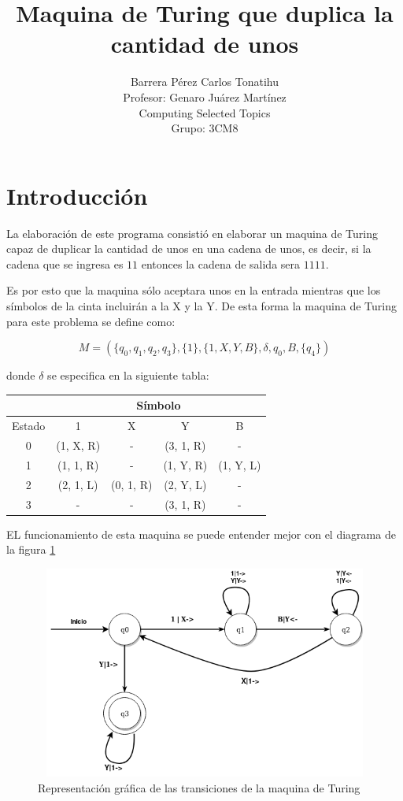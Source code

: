 \documentclass[a4paper,12pt]{article}
\title{Maquina de Turing que duplica la cantidad de unos}
\author{Barrera Pérez Carlos Tonatihu \\ Profesor: Genaro Juárez Martínez \\ Computing Selected Topics \\ Grupo: 3CM8 }
\begin{document}
\maketitle
\newpage
\tableofcontents
\newpage
\section{Introducción}
La elaboración de este programa consistió en elaborar un maquina de Turing capaz de duplicar la cantidad de unos en una cadena de unos, es decir, si la cadena que se ingresa es $ 11 $ entonces la cadena de salida sera $ 1111 $.

Es por esto que la maquina sólo aceptara unos en la entrada mientras que los símbolos de la cinta incluirán a la X y la Y. De esta forma la maquina de Turing para este problema se define como:

\[M=(\lbrace q_{0}, q_{1}, q_{2}, q_{3}\rbrace, \lbrace 1 \rbrace, \lbrace 1, X, Y, B \rbrace, \delta, q_{0}, B, \lbrace q_{4} \rbrace)\]

donde $ \delta $ se especifica en la siguiente tabla:
\begin{center}
\begin{tabular}{|c|c|c|c|c|}
\hline
& \multicolumn{4}{|c|}{Símbolo} \\ \hline
Estado & 1 & X & Y & B\\ \hline
0 & (1, X, R) & - & (3, 1, R) & -\\ \hline
1 & (1, 1, R) & - & (1, Y, R) & (1, Y, L)\\ \hline
2 & (2, 1, L) & (0, 1, R) & (2, Y, L) & -\\ \hline
3 & - & - & (3, 1, R) & - \\ \hline
\end{tabular}
\end{center}

EL funcionamiento de esta maquina se puede entender mejor con el diagrama de la figura \ref{fig:diagrama}

\begin{figure}[H]
\begin{center}
 \includegraphics[width=12cm, height=7cm]{Turing-unos.png}
 \caption{Representación gráfica de las transiciones de la maquina de Turing}
 \label{fig:diagrama}
\end{center}
\end{figure}
\end{document}
